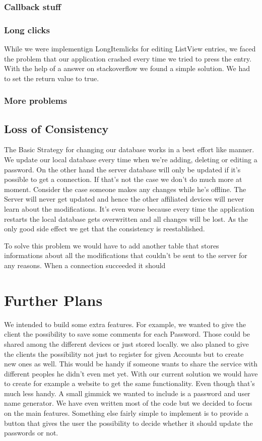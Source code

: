 \documentclass{report}
\begin{document}
\subsubsection{Callback stuff}
\subsubsection{Long clicks}
While we were implementign LongItemlicks for editing ListView entries, we faced the problem that our application crashed every time we tried to press the entry. With the help of a answer on stackoverflow  we found a simple solution. We had to set the return value to true.
\subsubsection{More problems}

\subsection{Loss of Consistency}
The Basic Strategy for changing our database works in a best effort like manner. We update our local database every time when we're adding, deleting or editing a password. On the other hand the server database will only be updated if it's possible to get a connection. If that's not the case we don't do much more at moment.
Consider the case someone makes any changes while he's offline. The Server will never get updated and hence the other affiliated devices will never learn about the modifications. It's even worse because every time the application restarts the local database gets overwritten and all changes will be lost. As the only good side effect we get that the consistency is reestablished.

To solve this problem we would have to add another table that stores informations about all the modifications that couldn't be sent to the server for any reasons. When a connection succeeded it should 

\section{Further Plans}
We intended to build some extra features. For example, we wanted to give the client the possibility to save some comments for each Password. Those could be shared among the different devices or just stored locally. 
we also planed to give the clients the possibility not just to register for given Accounts but to create new ones as well. This would be handy if someone wants to share the service with different peoples he didn't even met yet. With our current solution we would have to create for example a website to get the same functionality.
Even though that's much less handy.
A small gimmick we wanted to include is a password and user name  generator. We have even written most of the code but we decided to focus on the main features. 
Something else fairly simple to implement is to provide a button that gives the user the possibility to decide whether it should update the passwords or not.  
\end{document}
